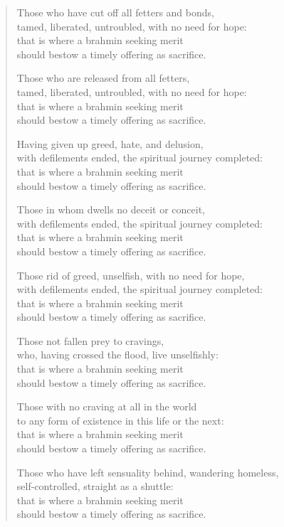 \documentclass[12pt,openany]{book}%
\begin{document}
\begin{verse}
Those who have cut off all fetters and bonds, \\
tamed, liberated, untroubled, with no need for hope: \\
that is where a brahmin seeking merit \\
should bestow a timely offering as sacrifice. 

Those who are released from all fetters, \\
tamed, liberated, untroubled, with no need for hope: \\
that is where a brahmin seeking merit \\
should bestow a timely offering as sacrifice. 

Having given up greed, hate, and delusion, \\
with defilements ended, the spiritual journey completed: \\
that is where a brahmin seeking merit \\
should bestow a timely offering as sacrifice. 

Those in whom dwells no deceit or conceit, \\
with defilements ended, the spiritual journey completed: \\
that is where a brahmin seeking merit \\
should bestow a timely offering as sacrifice. 

Those rid of greed, unselfish, with no need for hope, \\
with defilements ended, the spiritual journey completed: \\
that is where a brahmin seeking merit \\
should bestow a timely offering as sacrifice. 

Those not fallen prey to cravings, \\
who, having crossed the flood, live unselfishly: \\
that is where a brahmin seeking merit \\
should bestow a timely offering as sacrifice. 

Those with no craving at all in the world \\
to any form of existence in this life or the next: \\
that is where a brahmin seeking merit \\
should bestow a timely offering as sacrifice. 

Those who have left sensuality behind, wandering homeless, \\
self-controlled, straight as a shuttle: \\
that is where a brahmin seeking merit \\
should bestow a timely offering as sacrifice. 


\end{verse}
\end{document}
